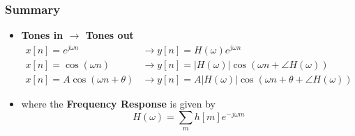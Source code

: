 \documentclass{beamer}
\begin{document}
\begin{frame}
  \frametitle{Summary}
  \begin{itemize}
  \item {\bf Tones in $\rightarrow$ Tones out}
    \begin{align*}
      x[n]=e^{j\omega n} &\rightarrow y[n]=H(\omega)e^{j\omega n}\\
      x[n]=\cos\left(\omega n\right)
      &\rightarrow y[n]=|H(\omega)|\cos\left(\omega n+\angle H(\omega)\right)\\
      x[n]=A\cos\left(\omega n+\theta\right)
      &\rightarrow y[n]=A|H(\omega)|\cos\left(\omega n+\theta+\angle H(\omega)\right)
    \end{align*}
  \item where the {\bf Frequency Response} is given by
    \[
    H(\omega) = \sum_m h[m]e^{-j\omega m}
    \]
  \end{itemize}
\end{frame}  
        
\end{document}
